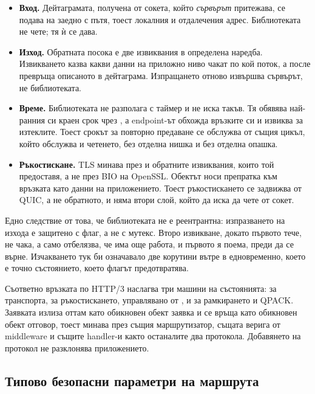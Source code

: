 \begin{itemize}
\item \textbf{Вход.} Дейтаграмата, получена от сокета, който \emph{сървърът} притежава, се
подава на  заедно с пътя, тоест локалния и отдалечения адрес.
Библиотеката не чете; тя ѝ се дава.
\item \textbf{Изход.} Обратната посока е две извиквания в определена наредба. Извикването
 казва какви данни на приложно ниво чакат по кой поток, а
после  превръща описаното в дейтаграма. Изпращането отново
извършва сървърът, не библиотеката.
\item \textbf{Време.} Библиотеката не разполага с таймер и не иска такъв. Тя обявява
най-ранния си краен срок чрез , а endpoint-ът обхожда
връзките си и извиква  за изтеклите. Тоест срокът за
повторно предаване се обслужва от същия цикъл, който обслужва и четенето, без отделна нишка и
без отделна опашка.
\item \textbf{Ръкостискане.} TLS минава през  и обратните извиквания,
които той предоставя, а не през BIO на OpenSSL. Обектът  носи препратка към
връзката като данни на приложението. Тоест ръкостискането се задвижва от QUIC, а не обратното,
и няма втори слой, който да иска да чете от сокет.
\end{itemize}

Едно следствие от това, че библиотеката не е реентрантна: изпразването на изхода е защитено с
флаг, а не с мутекс. Второ извикване, докато първото тече, не чака, а само отбелязва, че има
още работа, и първото я поема, преди да се върне. Изчакването тук би означавало две корутини
вътре в  едновременно, което е точно състоянието, което флагът предотвратява.

Съответно връзката по HTTP/3 наслагва три машини на състоянията:  за транспорта,
 за ръкостискането, управлявано от , и  за рамкирането и
QPACK. Заявката излиза оттам като обикновен обект заявка и се връща като обикновен обект
отговор, тоест минава през същия маршрутизатор, същата верига от middleware и същите
handler-и както останалите два протокола. Добавянето на протокол не разклонява приложението.

\subsection{Типово безопасни параметри на маршрута}

